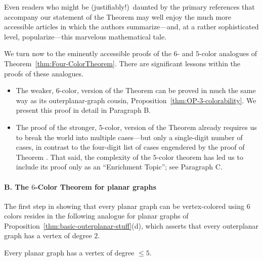 \smallskip

Even readers who might be (justifiably!)~daunted by the primary references \cite{AppelH77a,AppelH77b} that accompany our statement of the Theorem may well enjoy the much more accessible articles \cite{AppelH77c,AppelH89} in which the authors summarize---and, at a rather sophisticated level, popularize---this marvelous mathematical tale.

\bigskip

We turn now to the eminently accessible proofs of the $6$- and $5$-color analogues of Theorem~\ref{thm:Four-ColorTheorem}.  There are significant lessons within the proofs of these 
analogues.
\begin{itemize}
\item
The weaker, $6$-color, version of the Theorem can be proved in much the same way as its
outerplanar-graph cousin, Proposition~\ref{thm:OP-3-colorability}.  We
present this proof in detail in Paragraph B.  
\medskip\item
The proof of the stronger, $5$-color, version of the Theorem already requires us to break the world into multiple cases---but only a single-digit number of cases, in contrast to the four-digit list of cases engendered by the proof of Theorem \cite{AppelH77a,AppelH77b}.  That said, the complexity of the $5$-color theorem has led us to include its proof only as an ``Enrichment Topic''; see Paragraph C.
\end{itemize}


\paragraph {B. The $6$-Color Theorem for planar graphs}

The first step in showing that every planar graph can be vertex-colored using $6$ colors resides in the following analogue for planar graphs of Proposition~\ref{thm:basic-outerplanar-stuff}(d), which asserts that every outerplanar graph has a vertex of degree $2$.

\begin{lemma}
\label{thm:PlanarGraph-degree5}
Every planar graph has a vertex of degree $\leq 5$.
\end{lemma}

  

